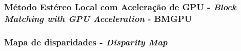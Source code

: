 \subsubsection{Método Estéreo Local com Aceleração de GPU - \textit{Block Matching with GPU Acceleration} - BMGPU}



\subsubsection{Mapa de disparidades - \textit{Disparity Map}}






